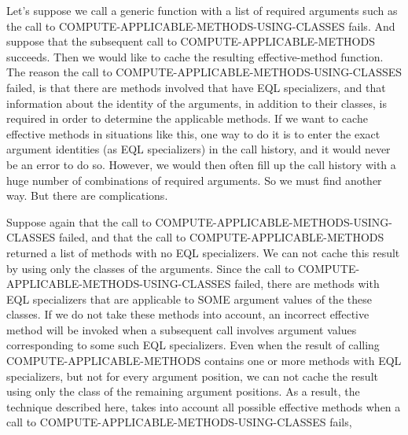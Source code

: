 Let's suppose we call a generic function with a list of required
arguments such as the call to COMPUTE-APPLICABLE-METHODS-USING-CLASSES
fails.  And suppose that the subsequent call to
COMPUTE-APPLICABLE-METHODS succeeds.  Then we would like to cache the
resulting effective-method function.  The reason the call to
COMPUTE-APPLICABLE-METHODS-USING-CLASSES failed, is that there are
methods involved that have EQL specializers, and that information
about the identity of the arguments, in addition to their classes, is
required in order to determine the applicable methods.  If we want to
cache effective methods in situations like this, one way to do it is
to enter the exact argument identities (as EQL specializers) in the
call history, and it would never be an error to do so.  However, we
would then often fill up the call history with a huge number of
combinations of required arguments.  So we must find another way.  But
there are complications.

Suppose again that the call to
COMPUTE-APPLICABLE-METHODS-USING-CLASSES failed, and that the call to
COMPUTE-APPLICABLE-METHODS returned a list of methods with no EQL
specializers.  We can not cache this result by using only the classes
of the arguments.  Since the call to
COMPUTE-APPLICABLE-METHODS-USING-CLASSES failed, there are methods
with EQL specializers that are applicable to SOME argument values of
the these classes.  If we do not take these methods into account, an
incorrect effective method will be invoked when a subsequent call
involves argument values corresponding to some such EQL specializers.
Even when the result of calling COMPUTE-APPLICABLE-METHODS contains
one or more methods with EQL specializers, but not for every argument
position, we can not cache the result using only the class of the
remaining argument positions.  As a result, the technique described
here, takes into account all possible effective methods when a call to
COMPUTE-APPLICABLE-METHODS-USING-CLASSES fails,

